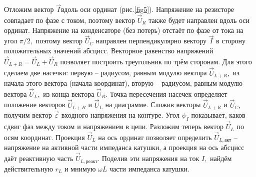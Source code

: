 {Отложим вектор $\vec I$вдоль оси ординат (рис.\ref{fig5}). Напряжение на резисторе совпадает по фа\-зе с током, поэтому вектор $\vec U_R$ также будет направлен вдоль оси ординат. Напряжение на кон\-денсаторе (без потерь) отстаёт по фазе от тока на угол $\pi/2,$ поэтому вектор $\vec U_C$ направлен пер\-пендикулярно вектору $\vec I$ в сторону положительных значений абсцисс. Векторное равенство напряжений $\vec U_{L+R}=\vec U_L+\vec U_R$ позволяет построить треугольник по трём сторонам. Для этого сделаем две насечки: первую – радиусом, равным модулю вектора $\vec U_{L+R},$ из начала этого век\-тора (начала координат), вторую – радиусом, равным модулю вектора $\vec U_L,$ из конца вектора $\vec U_R.$ Точка пересечения насечек определяет положение векторов $\vec U_{L+R}$ и $\vec U_L$ на диаграмме. Сложив векторы $\vec U_{L+R}$ и $\vec U_C,$ получим вектор $\vec\varepsilon$ входного напряжения на контуре. Угол $\psi_I$ показывает, каков сдвиг фаз между током и напряжением в цепи. Разложим теперь вектор $\vec U_L$ по осям координат. Проекция $\vec U_L$ на ось ординат позволяет определить $\vec U_{L,\text{акт}}$ – напряжение на активной части импеданса катушки, а проекция на ось абсцисс даёт реактивную часть $\vec U_{L,\text{реакт}}.$ Поделив эти напряжения на ток $I,$ найдём действительную $r_L$ и мнимую $\omega L$ части импеданса катушки.

}
